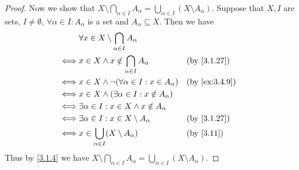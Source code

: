 \begin{proof}
  Now we show that \(X \setminus \bigcap_{\alpha \in I} A_{\alpha} = \bigcup_{\alpha \in I} (X \setminus A_{\alpha})\).
  Suppose that \(X, I\) are sets, \(I \neq \emptyset\), \(\forall \alpha \in I : A_{\alpha}\) is a set and \(A_{\alpha} \subseteq X\).
  Then we have
  \begin{align*}
         & \forall x \in X \setminus \bigcap_{\alpha \in I} A_{\alpha}                     \\
    \iff & x \in X \land x \notin \bigcap_{\alpha \in I} A_{\alpha}     &  & \by{3.1.27}   \\
    \iff & x \in X \land \lnot(\forall \alpha \in I : x \in A_{\alpha}) &  & \by{ex:3.4.9} \\
    \iff & x \in X \land (\exists \alpha \in I : x \notin A_{\alpha})                      \\
    \iff & \exists \alpha \in I : x \in X \land x \notin A_{\alpha}                        \\
    \iff & \exists \alpha \in I : x \in X \setminus A_{\alpha}          &  & \by{3.1.27}   \\
    \iff & x \in \bigcup_{\alpha \in I} (X \setminus A_{\alpha})        &  & \by{3.11}     \\
  \end{align*}
  Thus by \cref{3.1.4} we have \(X \setminus \bigcap_{\alpha \in I} A_{\alpha} = \bigcup_{\alpha \in I} (X \setminus A_{\alpha})\).
\end{proof}
